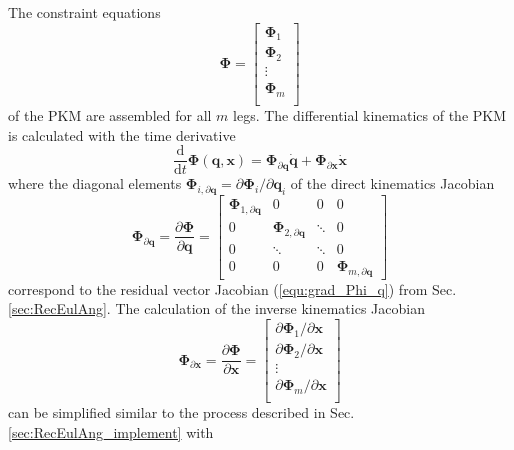 \documentclass{svproc}
\newcommand{\bm}[1]{\boldsymbol{#1}}
\begin{document}
The constraint equations
%
\begin{equation}
\bm{\Phi}
=
\begin{bmatrix}
\bm{\Phi}_1 \\
\bm{\Phi}_2 \\
\vdots \\
\bm{\Phi}_m \\
\end{bmatrix}
\end{equation}
%
of the PKM are assembled for all $m$ legs.
The differential kinematics of the PKM is calculated with the time derivative
%
\begin{equation}
\frac{\mathrm{d}}{{\mathrm{d}}t} \bm{\Phi}(\bm{q},\bm{x})
=
\bm{\Phi}_{\partial \bm{q}}  \dot{\bm{q}}
+
\bm{\Phi}_{\partial \bm{x}} \dot{\bm{x}}
\end{equation}
%
where the diagonal elements $\bm{\Phi}_{i,\partial \bm{q}}=\partial \bm{\Phi}_i / \partial \bm{q}_i$ of the direct kinematics Jacobian
%
\begin{equation}
\bm{\Phi}_{\partial \bm{q}}
=
\frac{\partial \bm{\Phi}}{\partial \bm{q}}
=
\begin{bmatrix}
\bm{\Phi}_{1,\partial \bm{q}}  & 0 & 0 & 0\\
0 & \bm{\Phi}_{2,\partial \bm{q}} & \ddots & 0  \\
0 & \ddots & \ddots & 0  \\
0 & 0 & 0 &\bm{\Phi}_{m,\partial \bm{q}}
\end{bmatrix}
\label{equ:PKM_phi_grad_q}
\end{equation}  
%
correspond to the residual vector Jacobian (\ref{equ:grad_Phi_q}) from Sec.\,\ref{sec:RecEulAng}.
The calculation of the inverse kinematics Jacobian
%
\begin{equation}
\bm{\Phi}_{\partial \bm{x}}
=
\frac{\partial \bm{\Phi}}{\partial \bm{x}}
=
\begin{bmatrix}
\partial \bm{\Phi}_1/\partial \bm{x}\\
\partial \bm{\Phi}_2/\partial \bm{x}\\
\vdots \\
\partial \bm{\Phi}_m/\partial \bm{x}\\
\end{bmatrix}
\label{equ:PKM_phi_grad_x}
\end{equation}  
%
can be simplified similar to the process described in Sec.\,\ref{sec:RecEulAng_implement} with
%
\end{document}
